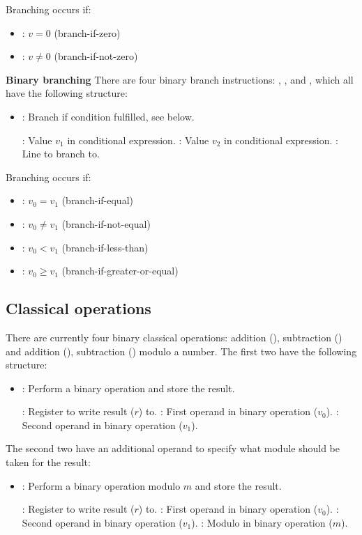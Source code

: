 Branching occurs if:
\begin{itemize}
  \item {}: $v = 0$ (branch-if-zero)
  \item {}: $v \neq 0$ (branch-if-not-zero)
\end{itemize}

\textbf{Binary branching}
There are four binary branch instructions: , ,  and , which all have the following structure:
\begin{itemize}
  \item {}: Branch if condition fulfilled, see below.

        : Value $v_1$ in conditional expression.
        : Value $v_2$ in conditional expression.
        : Line to branch to.
\end{itemize}

Branching occurs if:
\begin{itemize}
  \item {}: $v_0 = v_1$ (branch-if-equal)
  \item {}: $v_0 \neq v_1$ (branch-if-not-equal)
  \item {}: $v_0 < v_1$ (branch-if-less-than)
  \item {}: $v_0 \geq v_1$ (branch-if-greater-or-equal)
\end{itemize}


\subsection{Classical operations}
There are currently four binary classical operations: addition (), subtraction () and addition (), subtraction () modulo a number.
The first two have the following structure:
\begin{itemize}
  \item {}: Perform a binary operation and store the result.

        : Register to write result ($r$) to.
        : First operand in binary operation ($v_0$).
        : Second operand in binary operation ($v_1$).
\end{itemize}

The second two have an additional operand to specify what module should be taken for the result:
\begin{itemize}
  \item {}: Perform a binary operation modulo $m$ and store the result.

        : Register to write result ($r$) to.
        : First operand in binary operation ($v_0$).
        : Second operand in binary operation ($v_1$).
        : Modulo in binary operation ($m$).
\end{itemize}

